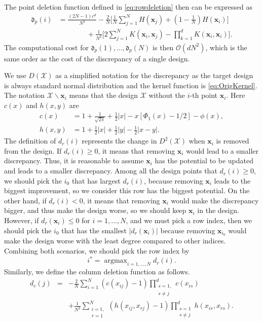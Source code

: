 \documentclass[graybox]{svmult}
\newcommand{\vx}{\boldsymbol{x}}
\DeclareMathOperator*{\argmax}{argmax}
\newcommand{\Xdes}{\mathcal{X}}
\newcommand{\frakd}{\mathfrak{d}}
\newcommand{\Order}{\mathcal{O}}
\def\abs#1{\ensuremath{\left \lvert #1 \right \rvert}}
\begin{document}
The point deletion function defined in \eqref{eq:rowdeletion} then can be expressed as
\begin{align}
\nonumber
\frakd_p(i) 
&= \frac{(2N-1)c^d}{N^2} - \frac{2}{N}\biggl[ \frac{1}{N} \sum_{j=1}^N  H(\vx_{j}) + \left(1 - \frac 1N \right) H(\vx_{i})  \biggr] \\
\label{eq:rowdeletionA}
& \qquad \qquad + \frac{1}{N^2}\biggl[2 \sum_{j=1}^N K(\vx_{i},\vx_{j})-\prod_{k=1}^d K(\vx_{i},\vx_{i})\biggr]. 
\end{align}
The computational cost for $\frakd_p(1), \ldots, \frakd_p(N)$ is then $\Order(dN^2)$, which is the same order as the cost of the discrepancy of a single design.








We use $D(\Xdes)$ as a simplified notation for the discrepancy as the target design is always standard normal distribution and the kernel function is \eqref{eq:OrigKernel}. 
The notation $\Xdes\backslash \vx_i$ means that the design $\Xdes$ without the $i$-th point $\vx_i$. 
Here $c(x)$ and $h(x,y)$ are 
\begin{align*}
c(x) &= 1+\frac{1}{\sqrt{2\pi}}+\frac{1}{2}|x|-x[\Phi_1(x)-1/2]-\phi(x),\\
h(x,y) &= 1+\frac{1}{2}|x|+\frac{1}{2}|y|-\frac{1}{2}|x-y|.
\end{align*}
The definition of $d_r(i)$ represents the change in $D^2(\Xdes)$ when $\vx_i$ is removed from the design. 
If $d_r(i)\geq 0$, it means that removing $\vx_i$ would lead to a smaller discrepancy. 
Thus, it is reasonable to assume $\vx_i$ has the potential to be updated and leads to a smaller discrepancy. 
Among all the design points that $d_r(i)\geq 0$, we should pick the $i_0$ that has largest $d_r(i)$, because removing $\vx_i$ leads to the biggest improvement, so we consider this row has the biggest potential. 
On the other hand, if $d_r(i)< 0$, it means that removing $\vx_i$ would make the discrepancy bigger, and thus make the design worse, so we should keep $\vx_i$ in the design. 
However, if $d_r(\vx_i)\leq 0$ for $i=1,\ldots, N$, and we must pick a row index, then we should pick the $i_0$ that has the smallest $\abs{d_r(\vx_i)}$ because removing $\vx_{i_0}$ would make the design worse with the least degree compared to other indices. 
Combining both scenarios, we should pick the row index by 
\[
i^*=\argmax_{i=1,\ldots,N} d_r(i).
\]
Similarly, we define the column deletion function as follows. 
\begin{eqnarray}\label{eq:coldeletion}
d_c(j) &=& -\frac{2}{N}\sum_{i=1}^N(c(x_{ij})-1)\prod\limits_{\substack{s=1,\\ s\neq j}}^dc(x_{is})\nonumber\\ 
&&+\frac{1}{N^2}\sum_{\substack{i=1,\\ r=1}}^N\left(h(x_{ij},x_{rj})-1\right)\prod_{\substack{s=1\\s\neq j}}^d h(x_{is},x_{rs}).
\end{eqnarray}
\end{document}
